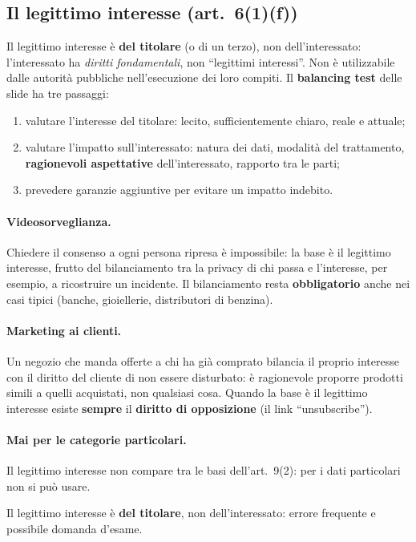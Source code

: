 \subsection{Il legittimo interesse (art.~6(1)(f))}
Il legittimo interesse è \textbf{del titolare} (o di un terzo), non dell'interessato: l'interessato ha
\emph{diritti fondamentali}, non ``legittimi interessi''. Non è utilizzabile dalle autorità pubbliche
nell'esecuzione dei loro compiti. Il \textbf{balancing test} delle slide ha tre passaggi:
\begin{enumerate}
  \item valutare l'interesse del titolare: lecito, sufficientemente chiaro, reale e attuale;
  \item valutare l'impatto sull'interessato: natura dei dati, modalità del trattamento,
    \textbf{ragionevoli aspettative} dell'interessato, rapporto tra le parti;
  \item prevedere garanzie aggiuntive per evitare un impatto indebito.
\end{enumerate}

\paragraph{Videosorveglianza.} Chiedere il consenso a ogni persona ripresa è impossibile: la base è il
legittimo interesse, frutto del bilanciamento tra la privacy di chi passa e l'interesse, per esempio, a
ricostruire un incidente. Il bilanciamento resta \textbf{obbligatorio} anche nei casi tipici (banche,
gioiellerie, distributori di benzina).

\paragraph{Marketing ai clienti.} Un negozio che manda offerte a chi ha già comprato bilancia il proprio
interesse con il diritto del cliente di non essere disturbato: è ragionevole proporre prodotti simili a
quelli acquistati, non qualsiasi cosa. Quando la base è il legittimo interesse esiste \textbf{sempre} il
\textbf{diritto di opposizione} (il link ``unsubscribe'').

\paragraph{Mai per le categorie particolari.} Il legittimo interesse non compare tra le basi
dell'art.~9(2): per i dati particolari non si può usare.

\begin{esame}
Il legittimo interesse è \textbf{del titolare}, non dell'interessato: errore frequente e possibile
domanda d'esame.
\end{esame}

